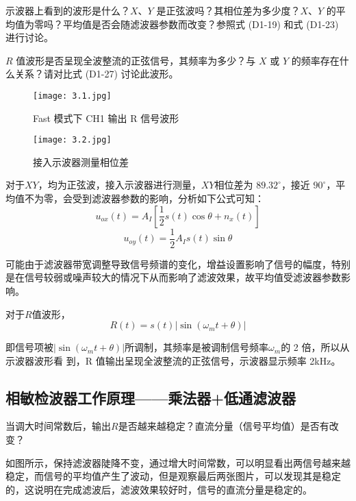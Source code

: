\documentclass[dvipsnames, svgnames,a4paper,11pt]{article}
\begin{document}
\begin{question}
	示波器上看到的波形是什么？$X$、$Y$ 是正弦波吗？其相位差为多少度？$X$、$Y$ 的平均值为零吗？平均值是否会随滤波器参数而改变？参照式 (D1-19) 和式 (D1-23) 进行讨论。

$R$ 值波形是否呈现全波整流的正弦信号，其频率为多少？与 $X$ 或 $Y$ 的频率存在什么关系？请对比式 (D1-27) 讨论此波形。

\end{question}
\begin{figure}[htbp]
    \centering
    \begin{minipage}{0.45\textwidth}
        \centering
        \texttt{[image: 3.1.jpg]}
        \caption{Fast 模式下 CH1 输出 R 信号波形}
        \label{fig:fast_mode_ch1_r_signal}
    \end{minipage}
    \hfill
    \begin{minipage}{0.45\textwidth}
        \centering
        \texttt{[image: 3.2.jpg]}
        \caption{接入示波器测量相位差}
        \label{fig:phase_difference_measurement}
    \end{minipage}
\end{figure}

	对于$XY$，均为正弦波，接入示波器进行测量，$XY$相位差为 $89.32^\circ$，接近 $90^\circ$，平均值不为零，会受到滤波器参数的影响，分析如下公式可知：
	$$u_{ox}(t)=A_I[\frac12s(t)\cos\theta+n_x(t)]$$
$$u_{oy}(t)=\frac12A_Is(t)\sin\theta$$

可能由于滤波器带宽调整导致信号频谱的变化，增益设置影响了信号的幅度，特别是在信号较弱或噪声较大的情况下从而影响了滤波效果，故平均值受滤波器参数影响。

对于$R$值波形，
$$R\left(t\right)=s(t)\left|\sin\left(\omega_mt+\theta\right)\right|$$

即信号项被$\left|\sin\left(\omega_mt+\theta\right)\right|$所调制，其频率是被调制信号频率$\omega_m$的 2 倍，所以从示波器波形看
到，R 值输出呈现全波整流的正弦信号，示波器显示频率 2kHz。
\subsection{相敏检波器工作原理——乘法器+低通滤波器}
\begin{question}
	当调大时间常数后，输出$R$是否越来越稳定？直流分量（信号平均值）是否有改变？
\end{question}
如图所示，保持滤波器陡降不变，通过增大时间常数，可以明显看出两信号越来越稳定，而信号的平均值产生了波动，但是观察最后两张图片，可以发现其是稳定的，这说明在完成滤波后，滤波效果较好时，信号的直流分量是稳定的。
\end{document}
